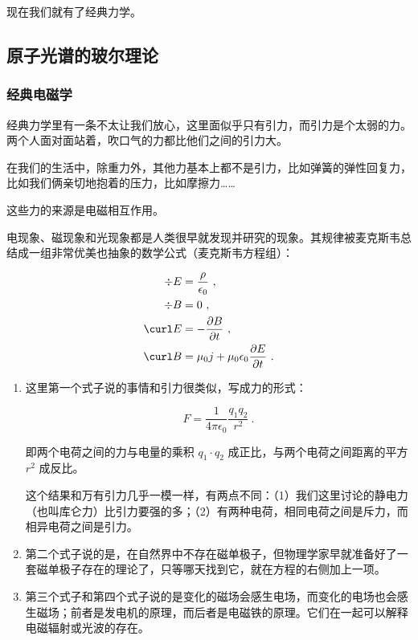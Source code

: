 现在我们就有了经典力学。

\subsection{原子光谱的玻尔理论}

\subsubsection{经典电磁学}

经典力学里有一条不太让我们放心，这里面似乎只有引力，而引力是个太弱的力。两个人面对面站着，吹口气的力都比他们之间的引力大。

在我们的生活中，除重力外，其他力基本上都不是引力，比如弹簧的弹性回复力，比如我们俩亲切地抱着的压力，比如摩擦力……

这些力的来源是电磁相互作用。

电现象、磁现象和光现象都是人类很早就发现并研究的现象。其规律被麦克斯韦总结成一组非常优美也抽象的数学公式（麦克斯韦方程组）：

\begin{equation}
\begin{aligned}
\div E & = \frac{\rho}{ \epsilon_0}~,\\
\div B & = 0~, \\
\curl E & = - \frac{\partial B}{\partial t}~, \\
\curl B & = \mu_0 j + \mu_0 \epsilon_0 \frac{\partial E}{\partial t}~.
\end{aligned}
\end{equation}


\begin{enumerate}
\item 

这里第一个式子说的事情和引力很类似，写成力的形式：

\begin{equation}
F = \frac{1}{4 \pi \epsilon_0} \frac{q_1 q_2}{r^2}~.
\end{equation}

即两个电荷之间的力与电量的乘积 $q_1 \cdot q_2$ 成正比，与两个电荷之间距离的平方 $r^2$ 成反比。

这个结果和万有引力几乎一模一样，有两点不同：（1）我们这里讨论的静电力（也叫库仑力）比引力要强的多；（2）有两种电荷，相同电荷之间是斥力，而相异电荷之间是引力。

\item

第二个式子说的是，在自然界中不存在磁单极子，但物理学家早就准备好了一套磁单极子存在的理论了，只等哪天找到它，就在方程的右侧加上一项。

\item

第三个式子和第四个式子说的是变化的磁场会感生电场，而变化的电场也会感生磁场；前者是发电机的原理，而后者是电磁铁的原理。它们在一起可以解释电磁辐射或光波的存在。

\end{enumerate}

